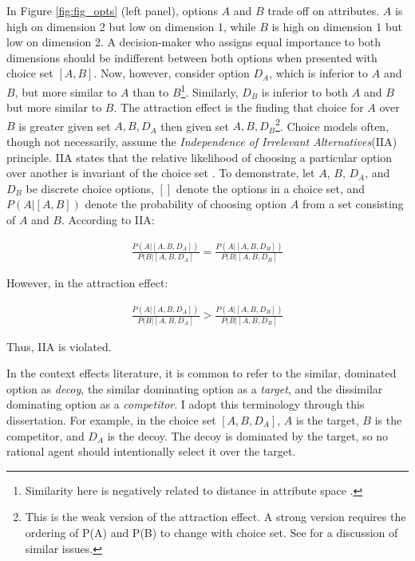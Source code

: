 \documentclass{umassthesis}          %
\begin{document}
In Figure \ref{fig:fig_opts} (left panel), options $A$ and $B$ trade off on attributes. $A$ is high on dimension 2 but low on dimension 1, while $B$ is high on dimension 1 but low on dimension 2. A decision-maker who assigns equal importance to both dimensions should be indifferent between both options when presented with choice set $[A,B]$. Now, however, consider option $D_{A}$, which is inferior to $A$ and $B$, but more similar to $A$ than to $B$\footnote{Similarity here is negatively related to distance in attribute space \parencite{shepardUniversalLawGeneralization1987c}.}. Similarly, $D_{B}$ is inferior to both $A$ and $B$ but more similar to $B$. The attraction effect is the finding that choice for $A$ over $B$ is greater given set ${A,B,D_{A}}$ then given set $A,B,D_{B}$\footnote{This is the weak version of the attraction effect. A strong version requires the ordering of P(A) and P(B) to change with choice set. See \textcite{davis2023illustrated} for a discussion of similar issues.}. 
Choice models often, though not necessarily, assume the \textit{Independence of Irrelevant Alternatives}(IIA) principle. IIA states that the relative likelihood of choosing a particular option over another is invariant of the choice set \parencite{ray1973independence}.  To demonstrate, let $A$, $B$, $D_{A}$, and $D_{B}$ be discrete choice options, $[]$ denote the options in a choice set, and $P(A|[A,B])$ denote the probability of choosing option $A$ from a set consisting of $A$ and $B$. According to IIA:

\begin{align}
  \frac{P(A|[A,B,D_{A}])}{P(B|[A,B,D_{A}]}=\frac{P(A|[A,B,D_{B}])}{P(B|[A,B,D_{B}]}
  \label{eqn:iia}
\end{align}

However, in the attraction effect:

\begin{align}
  \frac{P(A|[A,B,D_{A}])}{P(B|[A,B,D_{A}]}>\frac{P(A|[A,B,D_{B}])}{P(B|[A,B,D_{B}]}
  \label{eqn:iia_att}
\end{align}

Thus, IIA is violated.

In the context effects literature, it is common to refer to the similar, dominated option as \textit{decoy}, the similar dominating option as a \textit{target}, and the dissimilar dominating option as a \textit{competitor}. I adopt this terminology through this dissertation. For example, in the choice set $[A,B,D_{A}]$, $A$ is the target, $B$ is the competitor, and $D_{A}$ is the decoy.  The decoy is dominated by the target, so no rational agent should intentionally select it over the target.  
\end{document}
